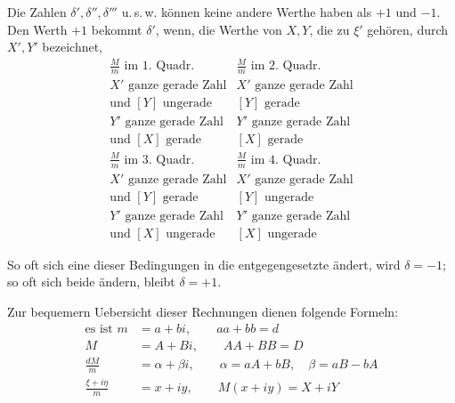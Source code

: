 Die Zahlen $\delta',\delta'',\delta'''$ u.\,s.\,w. können keine andere Werthe haben als $+1$ und $-1$. Den Werth $+1$ bekommt $\delta'$, wenn, die Werthe von $X,Y$, die zu $\xi'$ gehören, durch $X',Y'$ bezeichnet,
\[
\begin{array}{l|l}
\frac{M}{m}\text{ im 1. Quadr.}&\frac{M}{m}\text{ im 2. Quadr.}\\
X'\text{ ganze gerade Zahl}&X'\text{ ganze gerade Zahl}\\
\text{und }[Y]\text{ ungerade}&[Y]\text{ gerade}\\\hline
Y'\text{ ganze gerade Zahl}&Y'\text{ ganze gerade Zahl}\\
\text{und }[X]\text{ gerade}&[X]\text{ gerade}
\end{array}
\]
\[
\begin{array}{l|l}
\frac{M}{m}\text{ im 3. Quadr.}&\frac{M}{m}\text{ im 4. Quadr.}\\
X'\text{ ganze gerade Zahl}&X'\text{ ganze gerade Zahl}\\
\text{und }[Y]\text{ gerade}&[Y]\text{ ungerade}\\\hline
Y'\text{ ganze gerade Zahl}&Y'\text{ ganze gerade Zahl}\\
\text{und }[X]\text{ ungerade}&[X]\text{ ungerade}
\end{array}
\]

%
So oft sich eine dieser Bedingungen in die entgegengesetzte ändert, wird $\delta=-1$; so oft sich beide ändern, bleibt $\delta=+1$.

Zur bequemern Uebersicht dieser Rechnungen dienen folgende Formeln:
\[
\begin{aligned}
\text{es ist }m&=a+bi,\qquad aa+bb=d\\
M&=A+Bi,\qquad AA+BB=D\\
\frac{dM}{m}&=\alpha+\beta i,\qquad\alpha=aA+bB,\quad\beta=aB-bA\\
\frac{\xi+i\eta}{m}&=x+iy,\qquad M(x+iy)=X+iY
\end{aligned}
\]

